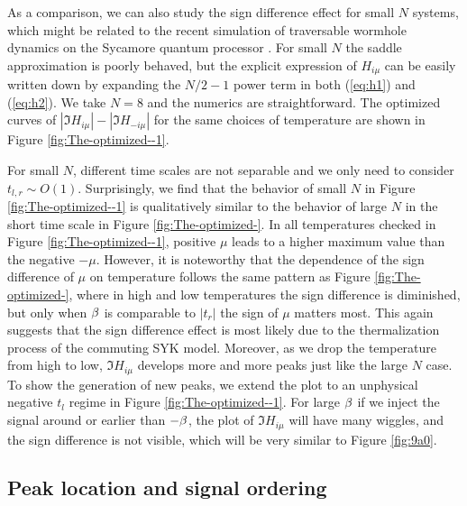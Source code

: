 \documentclass[11pt]{article}
\renewcommand{\>}{\rangle}
\newcommand{\<}{\langle}
\begin{document}
As a comparison, we can also study the sign difference effect for small $N$
systems, which might be related to the recent simulation of traversable
wormhole dynamics on the Sycamore quantum processor \cite{Jafferis:2022crx}.
For small $N$ the saddle approximation is poorly behaved, but the
explicit expression of $H_{i\mu}$ can be easily written down by expanding
the $N/2-1$ power term in both (\ref{eq:h1}) and (\ref{eq:h2}).
We take $N=8$ and the numerics are straightforward. The optimized
curves of $|\Im H_{i\mu}|-$$|\Im H_{-i\mu}|$ for the same choices
of temperature are shown in Figure \ref{fig:The-optimized--1}.


For small $N$, different time scales are not separable and we only
need to consider $t_{l,r}\sim O(1)$. Surprisingly, we find that the
behavior of small $N$ in Figure \ref{fig:The-optimized--1} is qualitatively
similar to the behavior of large $N$ in the short time scale in Figure
\ref{fig:The-optimized-}. In all temperatures checked in Figure \ref{fig:The-optimized--1},
positive $\mu$ leads to a higher maximum value than the negative
$-\mu$. However, it is noteworthy that the dependence of the sign
difference of $\mu$ on temperature follows the same pattern as Figure
\ref{fig:The-optimized-}, where in high and low temperatures the
sign difference is diminished, but only when $\beta$ is comparable to
$|t_{r}|$ the sign of $\mu$ matters most. This again suggests that
the sign difference effect is most likely due to the thermalization
process of the commuting SYK model. Moreover, as we drop the temperature
from high to low, $\Im H_{i\mu}$ develops more and more peaks just
like the large $N$ case. To show the generation of new peaks, we
extend the plot to an unphysical negative $t_{l}$ regime in Figure
\ref{fig:The-optimized--1}. For large $\beta$ if we inject the signal
around or earlier than $-\beta$, the plot of $\Im H_{i\mu}$ will have
many wiggles, and the sign difference is not visible, which will be
very similar to Figure \ref{fig:9a0}.

\subsection{Peak location and signal ordering}
\end{document}
